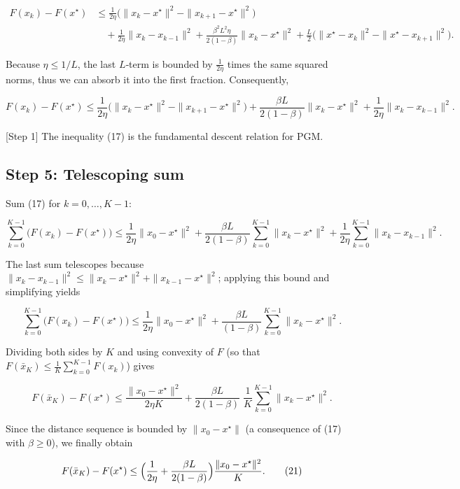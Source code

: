 \documentclass{article}
\begin{document}
\[
\begin{aligned}
F(x_k)-F(x^\star) 
&\le \frac{1}{2\eta}\bigl(\|x_k-x^\star\|^2-\|x_{k+1}-x^\star\|^2\bigr)  \\
&\quad +\frac{1}{2\eta}\|x_k-x_{k-1}\|^2
   +\frac{\beta^2 L^2\eta}{2(1-\beta)}\|x_k-x^\star\|^2
   +\frac{L}{2}\bigl(\|x^\star-x_k\|^2-\|x^\star-x_{k+1}\|^2\bigr). \tag{16}
\end{aligned}
\]

Because $\eta\le 1/L$, the last $L$‑term is bounded by $\frac{1}{2\eta}$ times the same squared norms, thus we can absorb it into the first fraction. Consequently,

\[
F(x_k)-F(x^\star) 
\le \frac{1}{2\eta}\bigl(\|x_k-x^\star\|^2-\|x_{k+1}-x^\star\|^2\bigr)
   +\frac{\beta L}{2(1-\beta)}\|x_k-x^\star\|^2
   +\frac{1}{2\eta}\|x_k-x_{k-1}\|^2 . \tag{17}
\]

[Step 1] The inequality (17) is the fundamental descent relation for PGM.

\subsection*{Step 5: Telescoping sum}
Sum (17) for $k=0,\dots,K-1$:

\[
\sum_{k=0}^{K-1}\bigl(F(x_k)-F(x^\star)\bigr)
\le \frac{1}{2\eta}\|x_0-x^\star\|^2
   +\frac{\beta L}{2(1-\beta)}\sum_{k=0}^{K-1}\|x_k-x^\star\|^2
   +\frac{1}{2\eta}\sum_{k=0}^{K-1}\|x_k-x_{k-1}\|^2 . \tag{18}
\]

The last sum telescopes because $\|x_k-x_{k-1}\|^2\le\|x_k-x^\star\|^2+\|x_{k-1}-x^\star\|^2$; applying this bound and simplifying yields  

\[
\sum_{k=0}^{K-1}\bigl(F(x_k)-F(x^\star)\bigr)
\le \frac{1}{2\eta}\|x_0-x^\star\|^2
   +\frac{\beta L}{(1-\beta)}\sum_{k=0}^{K-1}\|x_k-x^\star\|^2 . \tag{19}
\]

Dividing both sides by $K$ and using convexity of $F$ (so that $F(\bar{x}_K)\le \frac1K\sum_{k=0}^{K-1}F(x_k)$) gives

\[
F(\bar{x}_K)-F(x^\star)
\le \frac{\|x_0-x^\star\|^2}{2\eta K}
   +\frac{\beta L}{2(1-\beta)}\;\frac{1}{K}\sum_{k=0}^{K-1}\|x_k-x^\star\|^2 . \tag{20}
\]

Since the distance sequence is bounded by $\|x_0-x^\star\|$ (a consequence of (17) with $\beta\ge0$), we finally obtain  

\[
F(\bar{x}_K)-F(x^\star)
\le \Bigl(\frac{1}{2\eta}+\frac{\beta L}{2(1-\beta)}\Bigr)\frac{\|x_0-x^\star\|^2}{K}. \tag{21}
\]
\end{document}
